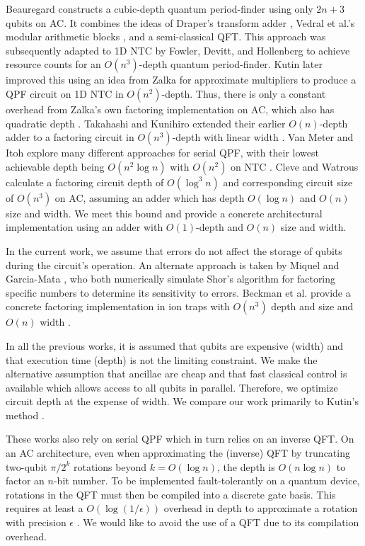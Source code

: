 \documentclass[twoside]{article}
\begin{document}
Beauregard \cite{Beauregard2002}
constructs a cubic-depth quantum period-finder using only $2n+3$ qubits on
\textsc{AC}.
It combines the ideas of Draper's transform adder \cite{Draper2000},
Vedral et al.'s modular arithmetic blocks \cite{Vedral1996}, and a
semi-classical QFT.
This approach was subsequently adapted to \textsc{1D NTC} by Fowler, Devitt,
and Hollenberg
\cite{Fowler2004} to achieve resource counts for an $O(n^3)$-depth
quantum period-finder. Kutin \cite{Kutin2006} later improved this using
an idea from Zalka for approximate multipliers to produce a QPF circuit on
\textsc{1D NTC}
in $O(n^2)$-depth. Thus, there is only a constant overhead from
Zalka's own factoring implementation on \textsc{AC}, which also has
quadratic depth \cite{Zalka1998}.
Takahashi and Kunihiro extended their earlier $O(n)$-depth adder to a factoring
circuit in $O(n^3)$-depth with linear width \cite{Takahashi2006}.
Van Meter and Itoh explore many different approaches for serial QPF,
with their lowest achievable depth being $O(n^2\log n)$ with
$O(n^2)$ on \textsc{NTC} \cite{VanMeter2005}. Cleve and Watrous
calculate a factoring circuit depth of $O(\log^3 n)$ and corresponding
circuit size of $O(n^3)$ on \textsc{AC},
assuming an adder which has depth $O(\log n)$ and
$O(n)$ size and width. We meet this bound and provide a concrete
architectural implementation using an adder with $O(1)$-depth and $O(n)$
size and width.

In the current work, we assume that errors do not affect the storage of qubits
during the circuit's operation. An alternate approach is taken by
Miquel \cite{Miquel1996} and Garcia-Mata \cite{GarciaMata2007}, who both
numerically simulate Shor's algorithm for factoring specific
numbers to determine its sensitivity to errors. Beckman et al. provide a
concrete factoring implementation in ion traps with $O(n^3)$ depth and size and
$O(n)$ width \cite{Beckman1996}.

In all the previous works,
it is assumed that qubits are expensive (width) and that
execution time (depth) is not the limiting constraint.
We make the alternative assumption that ancillae are cheap and that fast classical control
is available which allows access to all qubits in parallel.
Therefore, we optimize circuit depth at the expense of width.
We compare our work primarily to Kutin's method \cite{Kutin2006}.

These works also rely on serial QPF which in turn relies on an inverse QFT.
On an AC architecture, even when approximating the (inverse) QFT by truncating two-qubit
$\pi/2^k$ rotations beyond $k = O(\log n)$, 
the depth is $O(n \log n)$ to factor an $n$-bit number.
To be implemented fault-tolerantly on a quantum device, rotations in the QFT must then be compiled into a discrete gate basis.
This requires at least a $O(\log(1/\epsilon))$ overhead in depth to approximate a rotation with precision $\epsilon$ \cite{Harrow02, Kitaev2002}.
We would like to avoid the use of a QFT due to its compilation overhead.
\end{document}
